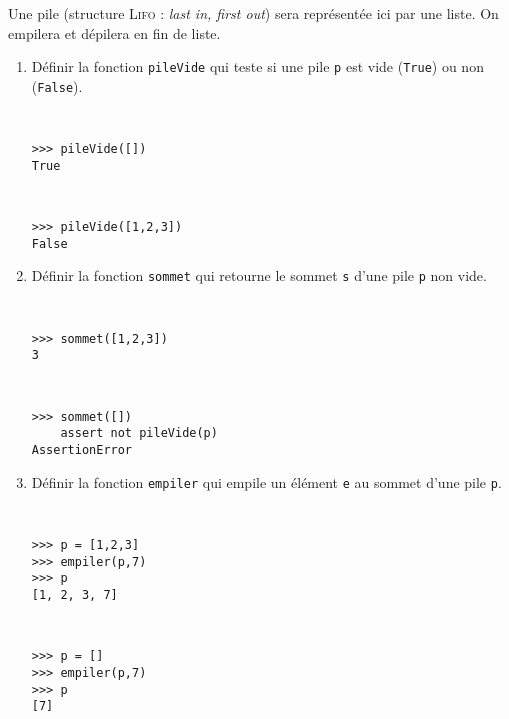 \begin{question}
Une pile (structure \textsc{Lifo} : \emph{last in, first out}) sera représentée ici par une liste. On empilera et dépilera en fin de liste.
\begin{enumerate}
\item Définir la fonction \texttt{pileVide} qui teste si une pile \texttt{p}
	est vide (\texttt{True}) ou non (\texttt{False}).

\noindent\begin{minipage}[t]{6cm}\tt\footnotesize
\begin{Verbatim}
>>> pileVide([])
True
\end{Verbatim}
\end{minipage}
\hfill
\begin{minipage}[t]{6cm}\tt\footnotesize
\begin{Verbatim}
>>> pileVide([1,2,3])
False
\end{Verbatim}
\end{minipage}
\vspace*{2mm}
	
\item Définir la fonction \texttt{sommet} qui retourne le sommet \texttt{s}
	d'une pile \texttt{p} non vide.

\noindent\begin{minipage}[t]{6cm}\tt\footnotesize
\begin{Verbatim}
>>> sommet([1,2,3])
3
\end{Verbatim}
\end{minipage}
\hfill
\begin{minipage}[t]{6cm}\tt\footnotesize
\begin{Verbatim}
>>> sommet([])
    assert not pileVide(p)
AssertionError
\end{Verbatim}
\end{minipage}
\vspace*{2mm}
	
\item Définir la fonction \texttt{empiler} qui empile un élément \texttt{e}
	au sommet d'une pile \texttt{p}.

\noindent\begin{minipage}[t]{6cm}\tt\footnotesize
\begin{Verbatim}
>>> p = [1,2,3]
>>> empiler(p,7)
>>> p
[1, 2, 3, 7]
\end{Verbatim}
\end{minipage}
\hfill
\begin{minipage}[t]{6cm}\tt\footnotesize
\begin{Verbatim}
>>> p = []
>>> empiler(p,7)
>>> p
[7]
\end{Verbatim}
\end{minipage}
\vspace*{2mm}
	

\end{enumerate}
\end{question}
